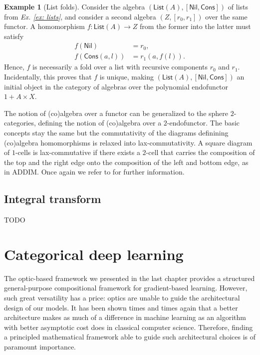\documentclass[12pt,a4paper,openright,twoside]{report}
\theoremstyle{plain}
\theoremstyle{definition}
\newtheorem{example}[proposition]{Example}
\begin{document}
\begin{example}[List folds]
  \label{ex: listfold}
  Consider the algebra $(\mathsf{List}(A), [\mathsf{Nil}, \mathsf{Cons}])$ of lists from \textit{Ex. \ref{ex: lists}}, and consider a second algebra $(Z, [r_0,r_1])$ over the same functor. A homomorphism $f: \mathsf{List}(A) \to Z$ from the former into the latter must satisfy 
  \begin{align*}
    f(\mathsf{Nil}) &= r_0,\\
    f(\mathsf{Cons}(a,l)) &= r_1(a,f(l)). 
  \end{align*}
  Hence, $f$ is necessarily a fold over a list with recursive components $r_0$ and $r_1$. Incidentally, this proves that $f$ is unique, making $(\mathsf{List}(A), [\mathsf{Nil}, \mathsf{Cons}])$ an initial object in the category of algebras over the polynomial endofunctor $1 + A \times X$.
\end{example}

The notion of (co)algebra over a functor can be generalized to the sphere $2$-categories, defining the notion of (co)algebra over a $2$-endofunctor. The basic concepts stay the same but the commutativity of the diagrams definining (co)algebra homomorphisms is relaxed into lax-commutativity. A square diagram of $1$-cells is lax-commutative if there exists a $2$-cell that carries the composition of the top and the right edge onto the composition of the left and bottom edge, as in ADDIM. Once again we refer to \cite{gavranovicposition} for further information.


\subsection{Integral transform}

TODO



\section{Categorical deep learning}

The optic-based framework we presented in the last chapter provides a structured general-purpose compositional framework for gradient-based learning. However, such great versatility has a price: optics are unable to guide the architectural design of our models. It has been shown times and times again that a better architecture makes as much of a difference in machine learning as an algorithm with better asymptotic cost does in classical computer science. 
Therefore, finding a principled mathematical framework able to guide such architectural choices is of paramount importance. 
\end{document}
